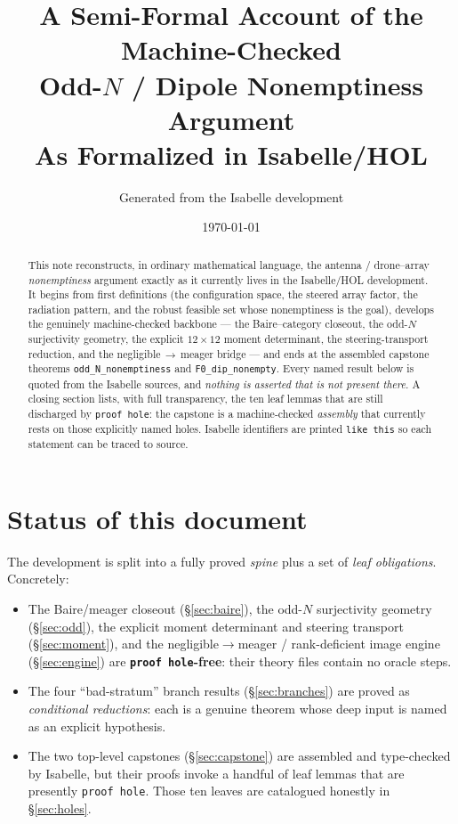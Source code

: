 \documentclass[11pt]{article}
\title{\bf A Semi-Formal Account of the Machine-Checked\\
  Odd-$N$ / Dipole Nonemptiness Argument\\[4pt]
  \large As Formalized in Isabelle/HOL}
\author{Generated from the Isabelle development\\
  \code{Verified\_Drone\_Theory/Applied\_Math\_Formalization}}
\date{\today}
\theoremstyle{plain}
\theoremstyle{definition}
\theoremstyle{remark}
\newcommand{\code}[1]{\texttt{\small #1}}
\begin{document}
\maketitle

\begin{abstract}
This note reconstructs, in ordinary mathematical language, the antenna /
drone--array \emph{nonemptiness} argument exactly as it currently lives in the
Isabelle/HOL development.  It begins from first definitions (the configuration
space, the steered array factor, the radiation pattern, and the robust feasible
set whose nonemptiness is the goal), develops the genuinely machine-checked
backbone --- the Baire--category closeout, the odd-$N$ surjectivity geometry, the
explicit $12\times 12$ moment determinant, the steering-transport reduction, and
the negligible$\,\to\,$meager bridge --- and ends at the assembled capstone
theorems \code{odd\_N\_nonemptiness} and \code{F0\_dip\_nonempty}.  Every named
result below is quoted from the Isabelle sources, and \emph{nothing is asserted
that is not present there.}  A closing section lists, with full transparency,
the ten leaf lemmas that are still discharged by \code{proof hole}: the capstone is a
machine-checked \emph{assembly} that currently rests on those explicitly named
holes.  Isabelle identifiers are printed \code{like this} so each statement can
be traced to source.
\end{abstract}

\tableofcontents

\section{Status of this document}

The development is split into a fully proved \emph{spine} plus a set of
\emph{leaf obligations}.  Concretely:

\begin{itemize}[leftmargin=1.4em]
\item The Baire/meager closeout (\S\ref{sec:baire}), the odd-$N$ surjectivity
  geometry (\S\ref{sec:odd}), the explicit moment determinant and steering
  transport (\S\ref{sec:moment}), and the negligible$\to$meager / rank-deficient
  image engine (\S\ref{sec:engine}) are \textbf{\code{proof hole}-free}: their
  theory files contain no oracle steps.
\item The four ``bad-stratum'' branch results (\S\ref{sec:branches}) are proved
  as \emph{conditional reductions}: each is a genuine theorem whose deep input
  is named as an explicit hypothesis.
\item The two top-level capstones (\S\ref{sec:capstone}) are assembled and
  type-checked by Isabelle, but their proofs invoke a handful of leaf lemmas
  that are presently \code{proof hole}.  Those ten leaves are catalogued honestly in
  \S\ref{sec:holes}.
\end{itemize}
\end{document}
